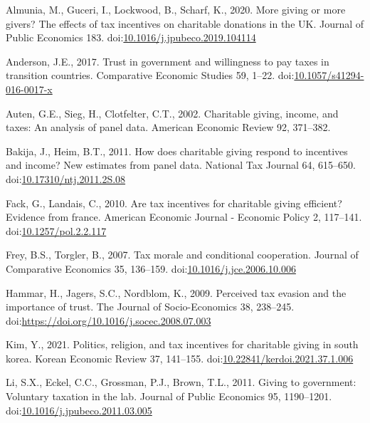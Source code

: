 \documentclass[
]{article}
\newlength{\cslhangindent}
\newlength{\cslentryspacingunit} %
\newenvironment{CSLReferences}[2] %
 {%
  \setlength{\parindent}{0pt}
  \ifodd #1
  \let\oldpar\par
  \def\par{\hangindent=\cslhangindent\oldpar}
  \fi
  \setlength{\parskip}{#2\cslentryspacingunit}
 }%
 {}
\begin{document}
\hypertarget{refs}{}
\begin{CSLReferences}{1}{0}
\leavevmode\hypertarget{ref-Almunia2020}{}%
Almunia, M., Guceri, I., Lockwood, B., Scharf, K., 2020. More giving or more givers? The effects of tax incentives on charitable donations in the UK. Journal of Public Economics 183. doi:\href{https://doi.org/10.1016/j.jpubeco.2019.104114}{10.1016/j.jpubeco.2019.104114}

\leavevmode\hypertarget{ref-Anderson2017}{}%
Anderson, J.E., 2017. Trust in government and willingness to pay taxes in transition countries. Comparative Economic Studies 59, 1--22. doi:\href{https://doi.org/10.1057/s41294-016-0017-x}{10.1057/s41294-016-0017-x}

\leavevmode\hypertarget{ref-Auten2002}{}%
Auten, G.E., Sieg, H., Clotfelter, C.T., 2002. Charitable giving, income, and taxes: An analysis of panel data. American Economic Review 92, 371--382.

\leavevmode\hypertarget{ref-Bakija2011}{}%
Bakija, J., Heim, B.T., 2011. How does charitable giving respond to incentives and income? New estimates from panel data. National Tax Journal 64, 615--650. doi:\href{https://doi.org/10.17310/ntj.2011.2S.08}{10.17310/ntj.2011.2S.08}

\leavevmode\hypertarget{ref-Fack2010}{}%
Fack, G., Landais, C., 2010. Are tax incentives for charitable giving efficient? Evidence from france. American Economic Journal - Economic Policy 2, 117--141. doi:\href{https://doi.org/10.1257/pol.2.2.117}{10.1257/pol.2.2.117}

\leavevmode\hypertarget{ref-Frey2007}{}%
Frey, B.S., Torgler, B., 2007. Tax morale and conditional cooperation. Journal of Comparative Economics 35, 136--159. doi:\href{https://doi.org/10.1016/j.jce.2006.10.006}{10.1016/j.jce.2006.10.006}

\leavevmode\hypertarget{ref-Hammar2009}{}%
Hammar, H., Jagers, S.C., Nordblom, K., 2009. Perceived tax evasion and the importance of trust. The Journal of Socio-Economics 38, 238--245. doi:\url{https://doi.org/10.1016/j.socec.2008.07.003}

\leavevmode\hypertarget{ref-Kim2021}{}%
Kim, Y., 2021. Politics, religion, and tax incentives for charitable giving in south korea. Korean Economic Review 37, 141--155. doi:\href{https://doi.org/10.22841/kerdoi.2021.37.1.006}{10.22841/kerdoi.2021.37.1.006}

\leavevmode\hypertarget{ref-Li2011}{}%
Li, S.X., Eckel, C.C., Grossman, P.J., Brown, T.L., 2011. Giving to government: Voluntary taxation in the lab. Journal of Public Economics 95, 1190--1201. doi:\href{https://doi.org/10.1016/j.jpubeco.2011.03.005}{10.1016/j.jpubeco.2011.03.005}


\end{CSLReferences}
\end{document}
